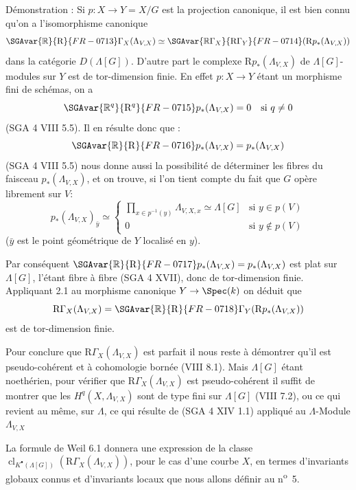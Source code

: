 Démonstration : Si $p:X\to Y=X/G$ est la projection canonique, il est bien connu qu'on a l'isomorphisme canonique
\[
\SGAvar{\mathbb{R}}{\mathrm{R}}{FR-0713}\Gamma_X(\Lambda_{V,X})\simeq \SGAvar{\mathbb{R}\Gamma_X}{\mathrm{R}\Gamma_Y}{FR-0714}(\mathrm{R}p_*(\Lambda_{V,X}))
\]
dans la catégorie $D(\Lambda[G])$. D'autre part le complexe $\mathrm{R}p_*(\Lambda_{V,X})$ de $\Lambda[G]$-modules sur $Y$ est de tor-dimension finie. En effet $p:X\to Y$ étant un morphisme fini de schémas, on a
\[
\SGAvar{\mathbb{R}^q}{\mathrm{R}^q}{FR-0715} p_*(\Lambda_{V,X})=0\quad\text{si }q\ne0
\]
(SGA 4 VIII 5.5). Il en résulte donc que :
\[
\SGAvar{\mathbb{R}}{\mathrm{R}}{FR-0716} p_*(\Lambda_{V,X})=p_*(\Lambda_{V,X})
\]
(SGA 4
VIII 5.5) nous donne aussi la possibilité de déterminer les fibres du faisceau $p_*(\Lambda_{V,X})$, et on trouve, si l'on tient compte du fait que $G$ opère librement sur $V$:
\[
p_*(\Lambda_{V,X})_{\bar y}\simeq
\begin{cases}
\displaystyle \prod_{x\in p^{-1}(y)}\Lambda_{V,X,x}\simeq \Lambda[G]& \text{si } y\in p(V)\\[1em]
0& \text{si } y\notin p(V)
\end{cases}
\]
($\bar y$ est le point géométrique de $Y$ localisé en $y$).

Par conséquent $\SGAvar{\mathbb{R}}{\mathrm{R}}{FR-0717} p_*(\Lambda_{V,X})=p_*(\Lambda_{V,X})$ est plat sur $\Lambda[G]$, l'étant fibre à fibre (SGA 4 XVII), donc de tor-dimension finie. Appliquant 2.1 au morphisme canonique $Y\to\Spec(k)$ on déduit que
\[
\mathrm{R}\Gamma_X(\Lambda_{V,X})=\SGAvar{\mathbb{R}}{\mathrm{R}}{FR-0718}\Gamma_Y(\mathrm{R}p_*(\Lambda_{V,X}))
\]
est de tor-dimension finie.

Pour conclure que $\mathrm{R}\Gamma_X(\Lambda_{V,X})$ est parfait il nous reste à démontrer qu'il est pseudo-cohérent et à cohomologie bornée (VIII 8.1). Mais $\Lambda[G]$ étant noethérien, pour vérifier que $\mathrm{R}\Gamma_X(\Lambda_{V,X})$ est pseudo-cohérent il suffit de montrer que les $H^q(X,\Lambda_{V,X})$ sont de type fini sur $\Lambda[G]$ (VIII 7.2), ou ce qui revient au même, sur $\Lambda$, ce qui résulte de (SGA 4 XIV 1.1) appliqué au $\Lambda$-Module $\Lambda_{V,X}$

La formule de Weil 6.1 donnera une expression de la classe $\operatorname{cl}_{K^\bullet(\Lambda[G])}(\mathrm{R}\Gamma_X(\Lambda_{V,X}))$, pour le cas d'une courbe $X$, en termes d'invariants globaux connus et d'invariants locaux que nous allons définir au n\textsuperscript{o}~5.

